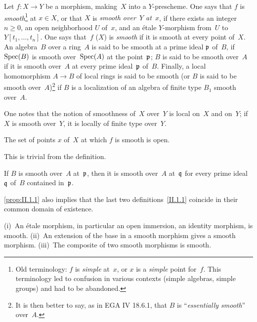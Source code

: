 \begin{definition}
\label{II.1.1}
Let $f\colon X \to Y$ be a morphism, making~$X$ into a
$Y$-prescheme. One says that $f$ is
\emph{smooth}\footnote{Old terminology: $f$ is \emph{simple}
at~$x$, or $x$ is a \emph{simple} point for~$f$. This
terminology led to confusion in various contexts
(simple algebras, simple groups) and had to be
abandoned.}
at $x \in X$, or that $X$ is \emph{smooth over~$Y$ at~$x$}, if there exists
an integer $n \geq 0$, an open neighborhood $U$ of~$x$, and an
\'etale $Y$-morphism from~$U$ to $Y[t_1,\dots,t_n]$. One says
that~$f$
(\resp $X$)
is \emph{smooth} if it is smooth at every point of~$X$. An
algebra~$B$ over a ring~$A$ is said to be smooth at a prime
ideal $\mathfrak{p}$ of~$B$, if $\operatorname{Spec}(B)$ is smooth over~$\operatorname{Spec}(A)$
at
the point~$\mathfrak{p}$;
$B$ is said to be smooth over~$A$ if it is smooth over~$A$ at every prime
ideal~$\mathfrak{p}$ of~$B$. Finally, a local homomorphism $A \to B$
of local rings is said to be smooth (or $B$ is said to be smooth over~$A$)\footnote{It is then better to say, as in EGA IV 18.6.1, that $B$
is ``\emph{essentially smooth}'' over~$A$.}
if $B$ is a localization of an algebra of finite type $B_1$ smooth
over~$A$.
\end{definition}

One notes that the notion of smoothness of~$X$ over~$Y$ is local on~$X$
and on~$Y$; if $X$ is smooth over~$Y$, it is locally of finite type
over~$Y$.

\setcounter{theorem}{0}
\begingroup
\renewcommand{\theHtheorem}{\theHsection.\arabic{theorem}.bis}
\begin{proposition}
\label{prop:II.1.1}
The set of points $x$ of~$X$ at which $f$ is smooth is open.
\end{proposition}
\endgroup

This is trivial from the definition.

\begin{corollary}
\label{II.1.2}
If $B$ is smooth over~$A$ at~$\mathfrak{p}$, then it is smooth over~$A$
at~$\mathfrak{q}$ for every prime ideal~$\mathfrak{q}$ of~$B$ contained
in~$\mathfrak{p}$.
\end{corollary}

\ref{prop:II.1.1} also implies that the last two
definitions~\ref{II.1.1} coincide in their common
domain of existence.

\begin{proposition}
\label{II.1.3}
\textup{(i)}~An \'etale morphism, in particular an open
immersion, an identity morphism, is smooth. \textup{(ii)}~An extension
of the base in a smooth morphism gives a smooth
morphism. \textup{(iii)}~The composite of two smooth morphisms is
smooth.
\end{proposition}

